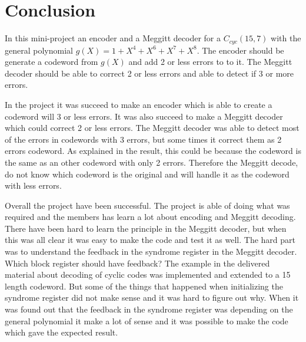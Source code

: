 \documentclass[Main]{subfiles}
\begin{document}
\section{Conclusion}
In this mini-project an encoder and a Meggitt decoder for a $C_{cyc}(15,7)$ with the general polynomial $g(X)=1+X^4+X^6+X^7+X^8$.
The encoder should be generate a codeword from $g(X)$ and add 2 or less errors to to it.
The Meggitt decoder should be able to correct 2 or less errors and able to detect if 3 or more errors.\newline

\noindent In the project it was succeed to make an encoder which is able to create a codeword will 3 or less errors.
It was also succeed to make a Meggitt decoder which could correct 2 or less errors.
The Meggitt decoder was able to detect most of the errors in codewords with 3 errors, but some times it correct them as 2 errors codeword.
As explained in the result, this could be because the codeword is the same as an other codeword with only 2 errors.
Therefore the Meggitt decode, do not know which codeword is the original and will handle it as the codeword with less errors. \newline

\noindent Overall the project have been successful.
The project is able of doing what was required and the members has learn a lot about encoding and Meggitt decoding.
There have been hard to learn the principle in the Meggitt decoder, but when this was all clear it was easy to make the code and test it as well.
The hard part was to understand the feedback in the syndrome register in the Meggitt decoder.
Which block register should have feedback?
The example in the delivered material about decoding of cyclic codes was implemented and extended to a 15 length codeword.
But some of the things that happened when initializing the syndrome register did not make sense and it was hard to figure out why.
When it was found out that the feedback in the syndrome register was depending on the general polynomial it make a lot of sense and it was possible to make the code which gave the expected result.
\end{document}
